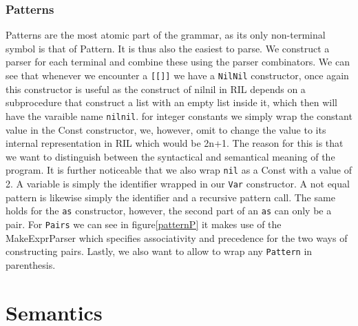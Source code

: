 \documentclass[a4paper]{article}
\begin{document}
\subsubsection{Patterns}
\label{sec:orga2db384}
Patterns are the most atomic part of the grammar, as its only non-terminal symbol is that of Pattern. It is thus also the easiest to parse. We construct a parser for each terminal and combine these using the parser combinators.
We can see that whenever we encounter a \texttt{[[]]} we have a \texttt{NilNil} constructor, once again this constructor is useful as the construct of nilnil in RIL depends on a subprocedure that construct a list with an empty list inside it, which then will have the varaible name \texttt{nilnil}. for integer constants we simply wrap the constant value in the Const constructor, we, however, omit to change the value to its internal representation in RIL which would be 2n+1. The reason for this is that we want to distinguish between the syntactical and semantical meaning of the program. It is further noticeable that we also wrap \texttt{nil} as a Const with a value of 2.
A variable is simply the identifier wrapped in our \texttt{Var} constructor.
A not equal pattern is likewise simply the identifier and a recursive pattern call. The same holds for the \texttt{as} constructor, however, the second part of an \texttt{as} can only be a pair. For \texttt{Pairs} we can see in figure\ref{patternP} it makes use of the MakeExprParser which specifies associativity and precedence for the two ways of constructing pairs.
Lastly, we also want to allow to wrap any \texttt{Pattern} in parenthesis.
\section{Semantics}
\label{semantics}
\end{document}
